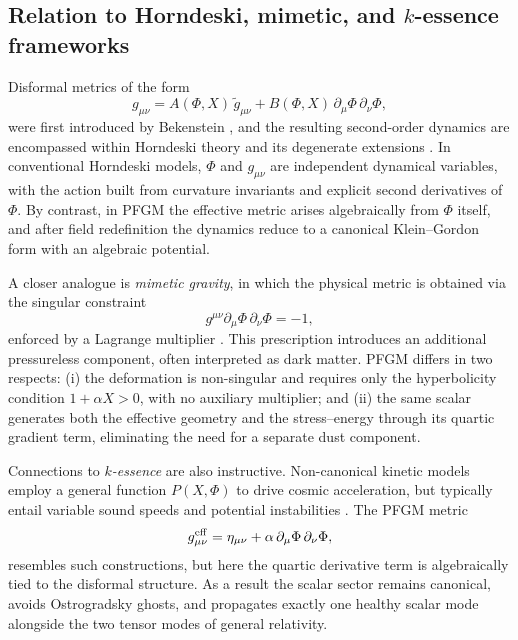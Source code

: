 \documentclass{article}
\begin{document}

\subsection{Relation to Horndeski, mimetic, and $k$-essence frameworks}

Disformal metrics of the form
\begin{equation}
g_{\mu\nu} = A(\Phi, X)\,\tilde{g}_{\mu\nu} + B(\Phi, X)\,\partial_\mu \Phi \,\partial_\nu \Phi ,
\label{eq:Bekenstein}
\end{equation}
were first introduced by Bekenstein \cite{Bekenstein1993}, and the resulting second-order dynamics are encompassed within Horndeski theory and its degenerate extensions \cite{Horndeski1974,Zumalacarregui2014,Kobayashi2019}. In conventional Horndeski models, $\Phi$ and $g_{\mu\nu}$ are independent dynamical variables, with the action built from curvature invariants and explicit second derivatives of $\Phi$. By contrast, in PFGM the effective metric arises algebraically from $\Phi$ itself, and after field redefinition the dynamics reduce to a canonical Klein–Gordon form with an algebraic potential.

A closer analogue is \emph{mimetic gravity}, in which the physical metric is obtained via the singular constraint
\begin{equation}
g^{\mu\nu}\partial_\mu \Phi \,\partial_\nu \Phi = -1 ,
\label{eq:MimeticConstraint}
\end{equation}
enforced by a Lagrange multiplier \cite{Sebastiani2017}. This prescription introduces an additional pressureless component, often interpreted as dark matter. PFGM differs in two respects: (i) the deformation is non-singular and requires only the hyperbolicity condition $1+\alpha X>0$, with no auxiliary multiplier; and (ii) the same scalar generates both the effective geometry and the stress–energy through its quartic gradient term, eliminating the need for a separate dust component.

Connections to \emph{$k$-essence} are also instructive. Non-canonical kinetic models employ a general function $P(X,\Phi)$ to drive cosmic acceleration, but typically entail variable sound speeds and potential instabilities \cite{ArmendarizPicon2000,DeFelice2010}. The PFGM metric
\begin{equation}
g^{\rm eff}_{\mu\nu} = \eta_{\mu\nu} + \alpha\,\partial_\mu \Phi \,\partial_\nu \Phi ,
\end{equation}
resembles such constructions, but here the quartic derivative term is algebraically tied to the disformal structure. As a result the scalar sector remains canonical, avoids Ostrogradsky ghosts, and propagates exactly one healthy scalar mode alongside the two tensor modes of general relativity.
\end{document}
